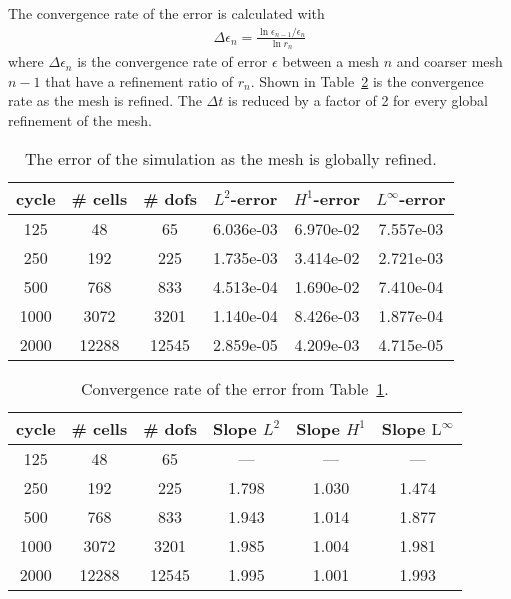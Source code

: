 \documentclass{article}
\begin{document}
The convergence rate of the error is calculated with
\begin{align*}
  \Delta \epsilon_n = \frac{\ln{\epsilon_{n-1}/\epsilon_{n}}}{\ln{r_n}}
\end{align*}
where $\Delta \epsilon_n$ is the convergence rate of error $\epsilon$ between a mesh $n$ and
coarser mesh $n-1$ that have a refinement ratio of $r_n$.
Shown in Table~\ref{tbl:convergenceRate} is the convergence rate as the mesh is
refined.
The $\Delta t$ is reduced by a factor of 2 for every global refinement of the mesh.

\begin{table}\label{tbl:errorMFG}
  \begin{center}
    \begin{tabular}{|c|c|c|c|c|c|} \hline
      cycle & \# cells & \# dofs & $L^2$-error & $H^1$-error & $L^\infty$-error \\ \hline
      125 & 48 & 65 & 6.036e-03 & 6.970e-02 & 7.557e-03\\ \hline
      250 & 192 & 225 & 1.735e-03 & 3.414e-02 & 2.721e-03 \\ \hline
      500 & 768 & 833 & 4.513e-04 & 1.690e-02 & 7.410e-04 \\ \hline
      1000 & 3072 & 3201 & 1.140e-04 & 8.426e-03 & 1.877e-04 \\ \hline
      2000 & 12288 & 12545 & 2.859e-05 & 4.209e-03 & 4.715e-05 \\ \hline
    \end{tabular}
  \end{center}
  \caption{The error of the simulation as the mesh is globally refined.}
\end{table}

\begin{table}\label{tbl:convergenceRate}
  \begin{center}
    \begin{tabular}{|c|c|c|c|c|c|} \hline
      cycle & \# cells & \# dofs & Slope $L^2$ & Slope $H^1$  & Slope $\textrm{L}^\infty$ \\ \hline
      125 & 48 & 65 & --- & --- & --- \\ \hline
      250 & 192 & 225 & 1.798 & 1.030 & 1.474 \\ \hline
      500 & 768 & 833 & 1.943 & 1.014 & 1.877 \\ \hline
      1000 & 3072 & 3201 & 1.985 & 1.004 & 1.981 \\ \hline
      2000 & 12288 & 12545 & 1.995 & 1.001  & 1.993 \\ \hline
    \end{tabular}
  \end{center}
  \caption{Convergence rate of the error from Table~\ref{tbl:errorMFG}.}
\end{table}
\end{document}

